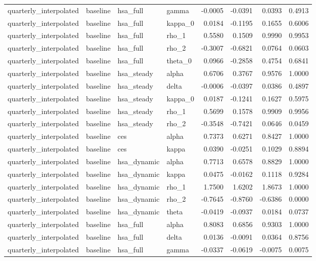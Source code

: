 \begin{tabular}{llllrrrr}
quarterly\_interpolated & baseline & hsa\_full & gamma & -0.0005 & -0.0391 & 0.0393 & 0.4913 \\
quarterly\_interpolated & baseline & hsa\_full & kappa\_0 & 0.0184 & -0.1195 & 0.1655 & 0.6006 \\
quarterly\_interpolated & baseline & hsa\_full & rho\_1 & 0.5580 & 0.1509 & 0.9990 & 0.9953 \\
quarterly\_interpolated & baseline & hsa\_full & rho\_2 & -0.3007 & -0.6821 & 0.0764 & 0.0603 \\
quarterly\_interpolated & baseline & hsa\_full & theta\_0 & 0.0966 & -0.2858 & 0.4754 & 0.6841 \\
quarterly\_interpolated & baseline & hsa\_steady & alpha & 0.6706 & 0.3767 & 0.9576 & 1.0000 \\
quarterly\_interpolated & baseline & hsa\_steady & delta & -0.0006 & -0.0397 & 0.0386 & 0.4897 \\
quarterly\_interpolated & baseline & hsa\_steady & kappa\_0 & 0.0187 & -0.1241 & 0.1627 & 0.5975 \\
quarterly\_interpolated & baseline & hsa\_steady & rho\_1 & 0.5699 & 0.1578 & 0.9909 & 0.9956 \\
quarterly\_interpolated & baseline & hsa\_steady & rho\_2 & -0.3548 & -0.7421 & 0.0646 & 0.0459 \\
quarterly\_interpolated & baseline & ces & alpha & 0.7373 & 0.6271 & 0.8427 & 1.0000 \\
quarterly\_interpolated & baseline & ces & kappa & 0.0390 & -0.0251 & 0.1029 & 0.8894 \\
quarterly\_interpolated & baseline & hsa\_dynamic & alpha & 0.7713 & 0.6578 & 0.8829 & 1.0000 \\
quarterly\_interpolated & baseline & hsa\_dynamic & kappa & 0.0475 & -0.0162 & 0.1118 & 0.9284 \\
quarterly\_interpolated & baseline & hsa\_dynamic & rho\_1 & 1.7500 & 1.6202 & 1.8673 & 1.0000 \\
quarterly\_interpolated & baseline & hsa\_dynamic & rho\_2 & -0.7645 & -0.8760 & -0.6386 & 0.0000 \\
quarterly\_interpolated & baseline & hsa\_dynamic & theta & -0.0419 & -0.0937 & 0.0184 & 0.0737 \\
quarterly\_interpolated & baseline & hsa\_full & alpha & 0.8083 & 0.6856 & 0.9303 & 1.0000 \\
quarterly\_interpolated & baseline & hsa\_full & delta & 0.0136 & -0.0091 & 0.0364 & 0.8756 \\
quarterly\_interpolated & baseline & hsa\_full & gamma & -0.0337 & -0.0619 & -0.0075 & 0.0075 \\

\end{tabular}
